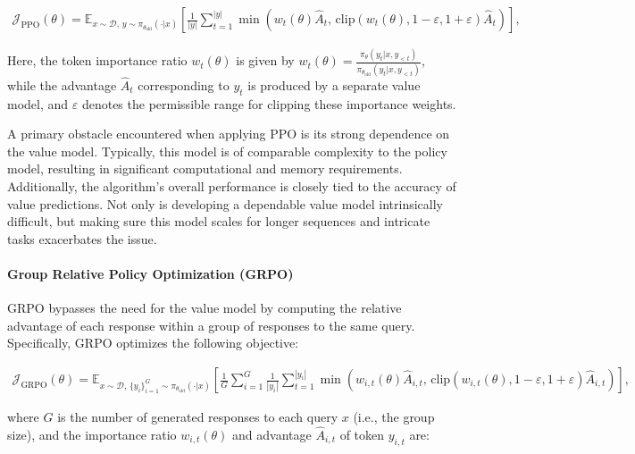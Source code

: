 \begin{align}
\mathcal{J}_\text{PPO}(\theta) = \mathbb{E}_{ x \sim \mathcal{D},\, y \sim \pi_{\theta_\text{old}}( \cdot | x) }
\left[ \frac{1}{|y|} \sum_{t=1}^{|y|} 
\min \left( w_{t}(\theta) \widehat{A}_{t},  \, \mathrm{clip} \left( w_{t}(\theta), 1 - {\varepsilon}, 1 + {\varepsilon}\right) \widehat{A}_{t} \right)
\right],
\end{align}

Here, the token importance ratio $w_{t}(\theta)$ is given by $
w_{t}(\theta) = \frac{ \pi_{\theta} (y_{t} | x, y_{<t}) }{ \pi_{\theta_\text{old}} (y_{t} | x,y_{<t})}$, while the advantage $\widehat{A}_{t}$ corresponding to $y_t$ is produced by a separate value model, and $\varepsilon$ denotes the permissible range for clipping these importance weights.

A primary obstacle encountered when applying PPO is its strong dependence on the value model. Typically, this model is of comparable complexity to the policy model, resulting in significant computational and memory requirements. Additionally, the algorithm's overall performance is closely tied to the accuracy of value predictions. Not only is developing a dependable value model intrinsically difficult, but making sure this model scales for longer sequences and intricate tasks exacerbates the issue.

\paragraph{Group Relative Policy Optimization (GRPO)} GRPO \citep{grpo} bypasses the need for the value model by computing the relative advantage of each response within a group of responses to the same query. Specifically, GRPO optimizes the following objective:

\begin{align}
\label{equ:grpo}
\mathcal{J}_\text{GRPO}(\theta) = \mathbb{E}_{ x \sim \mathcal{D},\, \{y_i\}_{i=1}^G \sim \pi_{\theta_\text{old}}( \cdot | x) }
\left[ \frac{1}{G} \sum_{i=1}^{G} \frac{1}{|y_i|} \sum_{t=1}^{|y_i|} 
\min \left( w_{i,t}(\theta) \widehat{A}_{i,t},  \, \mathrm{clip} \left( w_{i,t}(\theta), 1 - {\varepsilon}, 1 + {\varepsilon}\right) \widehat{A}_{i,t} \right)
\right],
\end{align}

where $G$ is the number of generated responses to each query $x$ (i.e., the group size), and the importance ratio $w_{i,t}(\theta)$ and advantage $\widehat{A}_{i,t}$ of token $y_{i,t}$ are:

